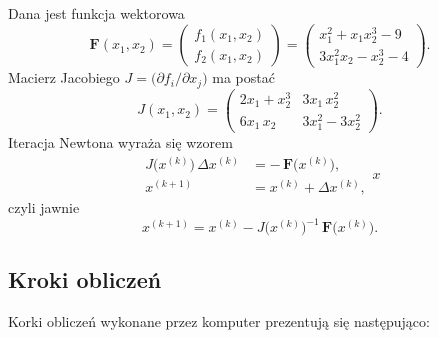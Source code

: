 \documentclass[a4paper,12pt]{article}
\begin{document}
    Dana jest funkcja wektorowa
    \[
    \mathbf{F}(x_1,x_2)
    =\begin{pmatrix}
    f_1(x_1,x_2)\\[6pt]
    f_2(x_1,x_2)
    \end{pmatrix}
    =
    \begin{pmatrix}
    x_1^2 + x_1 x_2^3 - 9 \\[4pt]
    3x_1^2 x_2 - x_2^3 - 4
    \end{pmatrix}.
    \]
    Macierz Jacobiego \(J = \bigl(\partial f_i/\partial x_j\bigr)\) ma postać
    \[
    J(x_1,x_2)
    =
    \begin{pmatrix}
    2x_1 + x_2^3 & 3x_1\,x_2^2\\[6pt]
    6x_1\,x_2   & 3x_1^2 - 3x_2^2
    \end{pmatrix}.
    \]
    Iteracja Newtona wyraża się wzorem
    \[
    \begin{aligned}
    J\bigl(x^{(k)}\bigr)\,\Delta x^{(k)}
    &= -\,\mathbf{F}\bigl(x^{(k)}\bigr),\\
    x^{(k+1)} &= x^{(k)} + \Delta x^{(k)},
    \end{aligned}x
    \]
    czyli jawnie
    \[
    x^{(k+1)}
    =
    x^{(k)}
    - J\bigl(x^{(k)}\bigr)^{-1}\,\mathbf{F}\bigl(x^{(k)}\bigr).
    \]
    
    
    \subsection*{Kroki obliczeń}
    
    Korki obliczeń wykonane przez komputer prezentują się następująco:
    
\end{document}
